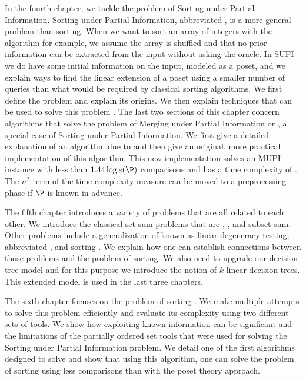 In the fourth chapter, we tackle the problem of Sorting under Partial
Information. Sorting under Partial Information, abbreviated , is
a more general problem than sorting. When we want to sort an array of integers
with the \quicksort algorithm for example, we assume the array is shuffled and
that no prior information can be extracted from the input without asking the
oracle. In SUPI we do have some initial information on the input, modeled as a
poset, and we explain ways
to find the linear extension of a poset using a smaller number of queries than
what would be required by classical sorting algorithms. We first define
the problem and explain its origins. We then explain techniques that can
be used to solve this problem \cite{kahn:1995,cardinal:2013}. The
last two sections of this chapter concern
algorithms that solve the problem of Merging under Partial Information or
, a special case of Sorting under Partial Information. We first
give a detailed explanation of an algorithm due to \citet*{linial:1984} and
then give an original, more practical implementation of this algorithm. This
new implementation solves an MUPI instance with less than \(1.44 \log e(\P)\)
comparisons and has a time complexity of . The
\(n^2\) term of the time complexity measure can be moved to a preprocessing
phase if \(\P\) is known in advance.

The fifth chapter introduces a variety of problems that are all related to
each other. We introduce the classical set sum problems that are
\threeSUM, \kSUM, and subset sum. Other problems include a generalization of
\kSUM known as linear degeneracy testing, abbreviated \kLDT, and sorting \XY.
We explain how one can establish connections between those problems and the problem
of sorting. We also need to upgrade our decision tree model and for this
purpose we introduce the notion of \(k\)-linear decision trees. This
extended model is used in the last three chapters.

The sixth chapter focuses on the problem of sorting \XY. We make
multiple attempts to solve this problem efficiently and evaluate its complexity
using two different sets of tools. We show how exploiting known information
can be significant and the limitations of the partially ordered set tools that
were used for solving the Sorting under Partial Information problem. We
detail one of the first algorithms designed to solve 
\cite{fredman:1976} and
show that using this algorithm, one can solve the problem of sorting \XY
using less comparisons than with the poset theory approach.

